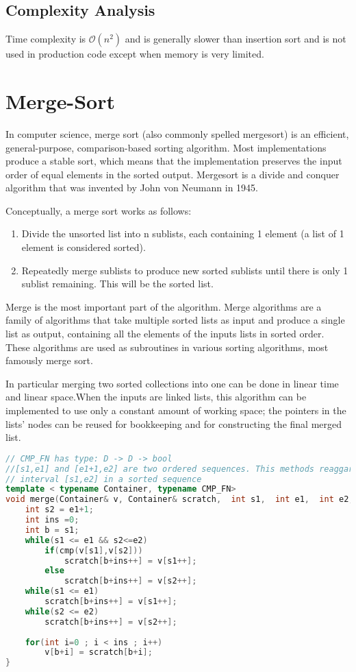 \subsection{Complexity Analysis}
Time complexity is  $\mathcal{O}(n^2)$ and is generally slower than insertion sort and is not used in production code except when memory is very limited.





\section{Merge-Sort}
In computer science, merge sort (also commonly spelled mergesort) is an efficient, general-purpose, comparison-based sorting algorithm. Most implementations produce a stable sort, which means that the implementation preserves the input order of equal elements in the sorted output. Mergesort is a divide and conquer algorithm that was invented by John von Neumann in 1945.

Conceptually, a merge sort works as follows:
\begin{enumerate}
\item Divide the unsorted list into n sublists, each containing 1 element (a list of 1 element is considered sorted).
\item Repeatedly merge sublists to produce new sorted sublists until there is only 1 sublist remaining. This will be the sorted list.
\end{enumerate} 

Merge is the most important part of the algorithm. Merge algorithms are a family of algorithms that take multiple sorted lists as input and produce a single list as output, containing all the elements of the inputs lists in sorted order. These algorithms are used as subroutines in various sorting algorithms, most famously merge sort.

In particular merging two sorted collections into one can be done in linear time and linear space.When the inputs are linked lists, this algorithm can be implemented to use only a constant amount of working space; the pointers in the lists' nodes can be reused for bookkeeping and for constructing the final merged list.

\begin{lstlisting}[language=c++, caption="Bubble-sort implementation in C++14"]
// CMP_FN has type: D -> D -> bool
//[s1,e1] and [e1+1,e2] are two ordered sequences. This methods reaggarne the whole
// interval [s1,e2] in a sorted sequence
template < typename Container, typename CMP_FN>
void merge(Container& v, Container& scratch,  int s1,  int e1,  int e2,CMP_FN cmp){
    int s2 = e1+1;
    int ins =0;
    int b = s1;
    while(s1 <= e1 && s2<=e2)
        if(cmp(v[s1],v[s2]))
            scratch[b+ins++] = v[s1++];
        else
            scratch[b+ins++] = v[s2++];
    while(s1 <= e1)
        scratch[b+ins++] = v[s1++];
    while(s2 <= e2)
        scratch[b+ins++] = v[s2++];
        
    for(int i=0 ; i < ins ; i++)
        v[b+i] = scratch[b+i];
}
\end{lstlisting}

